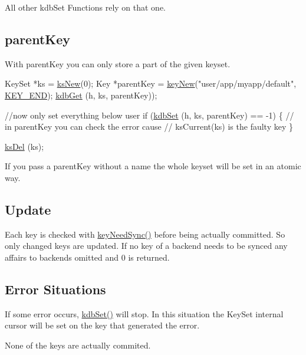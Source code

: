 All other kdb\-Set Functions rely on that one.\hypertarget{group__kdb_kdbsetparent}{}\subsection{parent\-Key}\label{group__kdb_kdbsetparent}
With parent\-Key you can only store a part of the given keyset.


\begin{DoxyCode}
KeySet *ks = \hyperlink{group__keyset_ga671e1aaee3ae9dc13b4834a4ddbd2c3c}{ksNew}(0);
Key *parentKey = \hyperlink{group__key_gad23c65b44bf48d773759e1f9a4d43b89}{keyNew}(\textcolor{stringliteral}{"user/app/myapp/default"}, \hyperlink{group__key_gga91fb3178848bd682000958089abbaf40aa8adb6fcb92dec58fb19410eacfdd403}{KEY\_END});
\hyperlink{group__kdb_ga28e385fd9cb7ccfe0b2f1ed2f62453a1}{kdbGet} (h, ks, parentKey));

\textcolor{comment}{//now only set everything below user}
\textcolor{keywordflow}{if} (\hyperlink{group__kdb_ga11436b058408f83d303ca5e996832bcf}{kdbSet} (h, ks, parentKey) == -1)
\{
        \textcolor{comment}{// in parentKey you can check the error cause}
        \textcolor{comment}{// ksCurrent(ks) is the faulty key}
\}

\hyperlink{group__keyset_ga27e5c16473b02a422238c8d970db7ac8}{ksDel} (ks);
\end{DoxyCode}


If you pass a parent\-Key without a name the whole keyset will be set in an atomic way.\hypertarget{group__kdb_kdbsetupdate}{}\subsection{Update}\label{group__kdb_kdbsetupdate}
Each key is checked with \hyperlink{group__keytest_gaf247df0de7aca04b32ef80e39ef12950}{key\-Need\-Sync()} before being actually committed. So only changed keys are updated. If no key of a backend needs to be synced any affairs to backends omitted and 0 is returned.\hypertarget{group__kdb_kdbseterror}{}\subsection{Error Situations}\label{group__kdb_kdbseterror}
If some error occurs, \hyperlink{group__kdb_ga11436b058408f83d303ca5e996832bcf}{kdb\-Set()} will stop. In this situation the Key\-Set internal cursor will be set on the key that generated the error.

None of the keys are actually commited.

